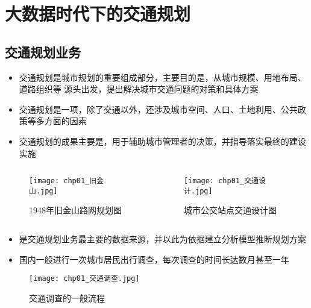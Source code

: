 

\section{大数据时代下的交通规划}

\subsection{交通规划业务}

\begin{frame}[t]{\subsecname}
\begin{itemize}
\item 交通规划是城市规划的重要组成部分，主要目的是，从城市规模、用地布局、道路组织等
源头出发，提出解决城市交通问题的对策和具体方案
\item 交通规划是一项，除了交通以外，还涉及城市空间、人口、土地利用、公共政策等多方面的因素
\item 交通规划的成果主要是，用于辅助城市管理者的决策，并指导落实最终的建设实施
\end{itemize}

\begin{columns}
  \begin{column}{.4\textwidth}
    \begin{figure}\flushright
      \texttt{[image: chp01\_旧金山.jpg]}
      \caption{1948年旧金山路网规划图}
    \end{figure}
  \end{column}
  \begin{column}{.6\textwidth}
    \begin{figure}\flushleft
      \texttt{[image: chp01\_交通设计.jpg]}
      \caption{城市公交站点交通设计图}
    \end{figure}
  \end{column}
\end{columns}
\end{frame}

\begin{frame}[t]{\subsecname}
\begin{itemize}
\item {}是交通规划业务最主要的数据来源，并以此为依据建立分析模型推断规划方案
\item 国内一般进行一次城市居民出行调查，每次调查的时间长达数月甚至一年
\end{itemize}

\begin{figure}
  \centering
  \texttt{[image: chp01\_交通调查.jpg]}
  \caption{交通调查的一般流程}
\end{figure}
\end{frame}

